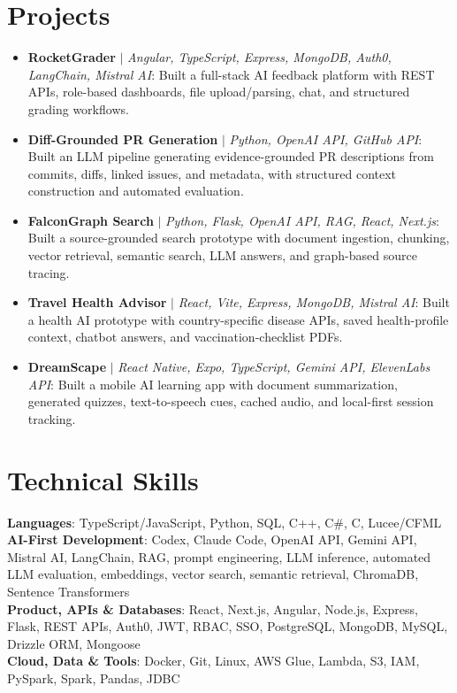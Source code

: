 \documentclass[letterpaper,11pt]{article}
\begin{document}
\section{Projects}
\begin{itemize}[leftmargin=0.15in, label={}, itemsep=0pt, topsep=0pt, parsep=0pt]
  \item\small{\textbf{RocketGrader} $|$ \emph{Angular, TypeScript, Express, MongoDB, Auth0, LangChain, Mistral AI}: Built a full-stack AI feedback platform with REST APIs, role-based dashboards, file upload/parsing, chat, and structured grading workflows.}
  \item\small{\textbf{Diff-Grounded PR Generation} $|$ \emph{Python, OpenAI API, GitHub API}: Built an LLM pipeline generating evidence-grounded PR descriptions from commits, diffs, linked issues, and metadata, with structured context construction and automated evaluation.}
  \item\small{\textbf{FalconGraph Search} $|$ \emph{Python, Flask, OpenAI API, RAG, React, Next.js}: Built a source-grounded search prototype with document ingestion, chunking, vector retrieval, semantic search, LLM answers, and graph-based source tracing.}
  \item\small{\textbf{Travel Health Advisor} $|$ \emph{React, Vite, Express, MongoDB, Mistral AI}: Built a health AI prototype with country-specific disease APIs, saved health-profile context, chatbot answers, and vaccination-checklist PDFs.}
  \item\small{\textbf{DreamScape} $|$ \emph{React Native, Expo, TypeScript, Gemini API, ElevenLabs API}: Built a mobile AI learning app with document summarization, generated quizzes, text-to-speech cues, cached audio, and local-first session tracking.}
\end{itemize}\vspace{-7pt}

\section{Technical Skills}
 \begin{itemize}[leftmargin=0.15in, label={}]
    \small{\item{
     \textbf{Languages}{: TypeScript/JavaScript, Python, SQL, C++, C\#, C, Lucee/CFML} \\
     \textbf{AI-First Development}{: Codex, Claude Code, OpenAI API, Gemini API, Mistral AI, LangChain, RAG, prompt engineering, LLM inference, automated LLM evaluation, embeddings, vector search, semantic retrieval, ChromaDB, Sentence Transformers} \\
     \textbf{Product, APIs \& Databases}{: React, Next.js, Angular, Node.js, Express, Flask, REST APIs, Auth0, JWT, RBAC, SSO, PostgreSQL, MongoDB, MySQL, Drizzle ORM, Mongoose} \\
     \textbf{Cloud, Data \& Tools}{: Docker, Git, Linux, AWS Glue, Lambda, S3, IAM, PySpark, Spark, Pandas, JDBC}
    }}
 \end{itemize}
\end{document}
